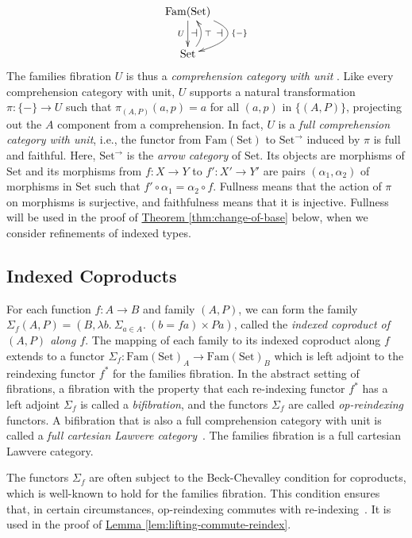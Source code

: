 \documentclass{LMCS}
\newcommand{\Fam}{\mathrm{Fam}}
\newcommand{\Set}{\mathrm{Set}}
\newcommand{\lemref}[1]{\hyperref[#1]{Lemma \ref*{#1}}}
\newcommand{\thmref}[1]{\hyperref[#1]{Theorem \ref*{#1}}}
\begin{document}
\begin{equation}\label{ex:cc-with-unit}
  \xymatrix{
    {\Fam(\Set)}
    \save[]+<0.2cm,-0.66cm>*{\footnotesize\dashv}\restore
    \save[]+<1cm,-0.66cm>*{\footnotesize\dashv}\restore
    \ar[d]_U
    \ar@/^3pc/[d]^{\{-\}}    
    \\
    {\Set}
    \ar@/_1pc/[u]_{\top}
  }
\end{equation}
The families fibration $U$ is thus a \emph{comprehension category with
  unit} \cite{jacobs93comprehension,jacobs99book}. Like every
comprehension category with unit, $U$ supports a natural
transformation $\pi : \{-\} \to U$ such that $\pi_{(A,P)}(a,p) = a$
for all $(a,p)$ in $\{(A,P)\}$, projecting out the $A$ component from
a comprehension. In fact, $U$ is a {\em full comprehension category
with unit}, i.e., the functor from $\Fam(\Set)$ to $\Set^\to$ induced
by $\pi$ is full and faithful. Here, $\Set^\to$ is the {\em arrow
  category} of $\Set$. Its objects are morphisms of $\Set$ and its
morphisms from $f:X\to Y$ to $f':X'\to Y'$ are pairs $(\alpha_1,
\alpha_2)$ of morphisms in $\Set$ such that $f' \circ \alpha_1 =
\alpha_2 \circ f$. Fullness means that the action of $\pi$ on
morphisms is surjective, and faithfulness means that it is injective.
Fullness will be used in the proof of \thmref{thm:change-of-base}
below, when we consider refinements of indexed types.

\subsection{Indexed Coproducts}\label{sec:sums}

For each function $f : A \to B$ and family $(A,P)$, we can form the
family $\Sigma_f(A,P) = (B, \lambda b.\ \Sigma_{a \in A}.\ (b = f a)
\times P a)$, called the {\em indexed coproduct of $(A,P)$ along $f$}.
The mapping of each family to its indexed coproduct along $f$ extends
to a functor $\Sigma_f : \Fam(\Set)_A \to \Fam(\Set)_B$ which is left
adjoint to the reindexing functor $f^*$ for the families fibration.
In the abstract setting of fibrations, a fibration with the property
that each re-indexing functor $f^*$ has a left adjoint $\Sigma_f$ is
called a \emph{bifibration}, and the functors $\Sigma_f$ are called
{\em op-reindexing} functors. A bifibration that is also a full
comprehension category with unit is called a {\em full cartesian
  Lawvere category}~\cite{jacobs93comprehension}. The families
fibration is a full cartesian Lawvere category.

The functors $\Sigma_f$ are often subject to the Beck-Chevalley
condition for coproducts, which is well-known to hold for the families
fibration. This condition ensures that, in certain circumstances,
op-reindexing commutes with re-indexing~\cite{jacobs99book}. It is
used in the proof of \lemref{lem:lifting-commute-reindex}.
\end{document}
